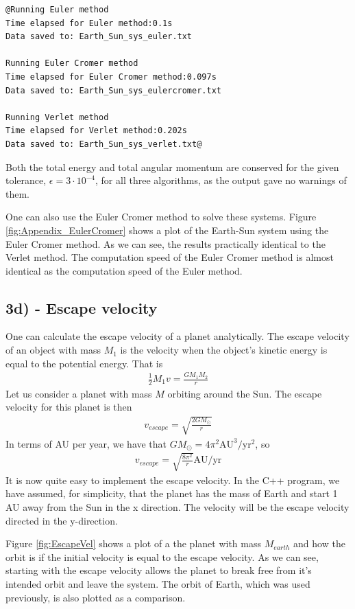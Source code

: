 \documentclass[12pt]{article}
\begin{document}
\begin{lstlisting}
@Running Euler method
Time elapsed for Euler method:0.1s
Data saved to: Earth_Sun_sys_euler.txt

Running Euler Cromer method
Time elapsed for Euler Cromer method:0.097s
Data saved to: Earth_Sun_sys_eulercromer.txt

Running Verlet method
Time elapsed for Verlet method:0.202s
Data saved to: Earth_Sun_sys_verlet.txt@
\end{lstlisting}

Both the total energy and total angular momentum are conserved for the given tolerance, $\epsilon = 3\cdot 10^{-4}$, for all three algorithms, as the output gave no warnings of them.

One can also use the Euler Cromer method to solve these systems. Figure \ref{fig:Appendix_EulerCromer} shows a plot of the Earth-Sun system using the Euler Cromer method. As we can see, the results practically identical to the Verlet method. The computation speed of the Euler Cromer method is almost identical as the computation speed of the Euler method.
\FloatBarrier

\subsection*{3d) - Escape velocity}
One can calculate the escape velocity of a planet analytically. The escape velocity of an object with mass $M_1$ is the velocity when the object's kinetic energy is equal to the potential energy. That is
\begin{align*}
\frac{1}{2}M_1v = \frac{GM_1M_2}{r}
\end{align*}
Let us consider a planet with mass $M$ orbiting around the Sun. The escape velocity for this planet is then
\begin{align*}
v_{escape} = \sqrt{\frac{2GM_{\odot}}{r}}
\end{align*}
In terms of AU per year, we have that $GM_{\odot} = 4\pi^2 \text{AU}^3/\text{yr}^2$, so
\begin{align*}
v_{escape} = \sqrt{\frac{8\pi^2}{r}} \text{AU}/\text{yr}
\end{align*}
It is now quite easy to implement the escape velocity. In the C++ program, we have assumed, for simplicity, that the planet has the mass of Earth and start 1 AU away from the Sun in the x direction. The velocity will be the escape velocity directed in the y-direction. 

Figure \ref{fig:EscapeVel} shows a plot of a the planet with mass $M_{earth}$ and how the orbit is if the initial velocity is equal to the escape velocity. As we can see, starting with the escape velocity allows the planet to break free from it's intended orbit and leave the system. The orbit of Earth, which was used previously, is also plotted as a comparison. 
\end{document}
